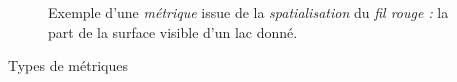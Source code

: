 \begin{figure}
  \centering
  
  \caption{Exemple d'une \emph{métrique} issue de la
    \emph{spatialisation} du \emph{fil rouge :} la part de la surface
    visible d'un lac donné.}
  \label{fig:metrique_part_lac}
\end{figure}

\begin{table}
  \centering
  
  \caption{Types de métriques}
  \label{fig:type_metriques}
\end{table}

